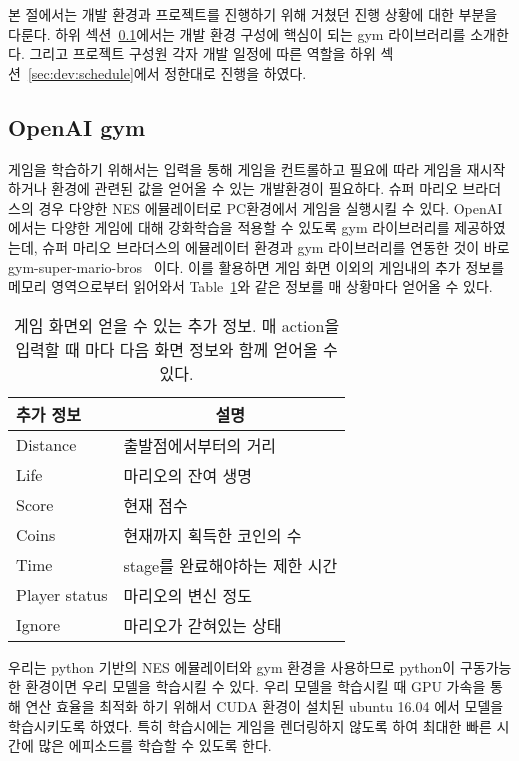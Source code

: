 
본 절에서는 개발 환경과 프로젝트를 진행하기 위해 거쳤던 진행 상황에 대한 부분을 다룬다.
하위 섹션~\ref{sec:dev:gym}에서는 개발 환경 구성에 핵심이 되는 gym 라이브러리를 소개한다.
그리고 프로젝트 구성원 각자 개발 일정에 따른 역할을 하위 섹션~\ref{sec:dev:schedule}에서 정한대로 진행을 하였다.

\subsection{OpenAI gym}
\label{sec:dev:gym}
게임을 학습하기 위해서는 입력을 통해 게임을 컨트롤하고 필요에 따라 게임을 재시작하거나 환경에 관련된 값을 얻어올 수 있는 개발환경이 필요하다.
슈퍼 마리오 브라더스의 경우 다양한 NES 에뮬레이터로 PC환경에서 게임을 실행시킬 수 있다.
OpenAI에서는 다양한 게임에 대해 강화학습을 적용할 수 있도록 gym 라이브러리를 제공하였는데, 슈퍼 마리오 브라더스의 에뮬레이터 환경과 gym 라이브러리를 연동한 것이 바로 gym-super-mario-bros~\cite{GYMMario} 이다.
이를 활용하면 게임 화면 이외의 게임내의 추가 정보를 메모리 영역으로부터 읽어와서 Table~\ref{tab:mario:info}와 같은 정보를 매 상황마다 얻어올 수 있다.

\begin{table}[h]
\centering
	\caption {
		게임 화면외 얻을 수 있는 추가 정보. 매 action을 입력할 때 마다 다음 화면 정보와 함께 얻어올 수 있다.
	}
	\label{tab:mario:info}
\begin{tabular}{ll}
\toprule
추가 정보      & \multicolumn{1}{c}{설명} \\
\midrule
Distance       & 출발점에서부터의 거리 \\
Life           & 마리오의 잔여 생명 \\
Score          & 현재 점수 \\
Coins          & 현재까지 획득한 코인의 수 \\
Time           & stage를 완료해야하는 제한 시간 \\
Player status  & 마리오의 변신 정도 \\
Ignore         & 마리오가 갇혀있는 상태 \\
\bottomrule
\end{tabular}
\end{table}

우리는 python 기반의 NES 에뮬레이터와 gym 환경을 사용하므로 python이 구동가능한 환경이면 우리 모델을 학습시킬 수 있다.
우리 모델을 학습시킬 때 GPU 가속을 통해 연산 효율을 최적화 하기 위해서 CUDA 환경이 설치된 ubuntu 16.04 에서 모델을 학습시키도록 하였다.
특히 학습시에는 게임을 렌더링하지 않도록 하여 최대한 빠른 시간에 많은 에피소드를 학습할 수 있도록 한다.

